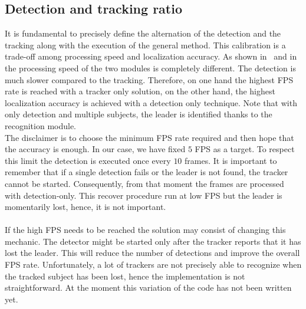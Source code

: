 \subsection{Detection and tracking ratio} \label{sec:ratioDetectTrack}
It is fundamental to precisely define the alternation of the detection and the tracking along with the execution of the general method. This calibration is a trade-off among processing speed and localization accuracy. As shown in~ and in~ the processing speed of the two modules is completely different. The detection is much slower compared to the tracking. Therefore, on one hand the highest FPS rate is reached with a tracker only solution, on the other hand, the highest localization accuracy is achieved with a detection only technique. Note that with only detection and multiple subjects, the leader is identified thanks to the recognition module.\\
The disclaimer is to choose the minimum FPS rate required and then hope that the accuracy is enough. In our case, we have fixed $5$ FPS as a target. To respect this limit the detection is executed once every $10$ frames. It is important to remember that if a single detection fails or the leader is not found, the tracker cannot be started. Consequently, from that moment the frames are processed with detection-only. This recover procedure run at low FPS but the leader is momentarily lost, hence, it is not important.\\
\\
If the high FPS needs to be reached the solution may consist of changing this mechanic. The detector might be started only after the tracker reports that it has lost the leader. This will reduce the number of detections and improve the overall FPS rate. Unfortunately, a lot of trackers are not precisely able to recognize when the tracked subject has been lost, hence the implementation is not straightforward. At the moment this variation of the code has not been written yet.


